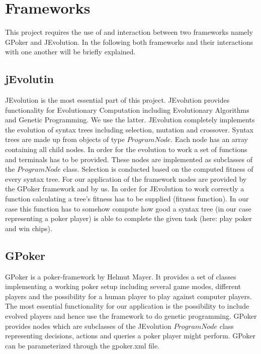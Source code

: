 	\section{Frameworks}
	This project requires the use of and interaction between two frameworks namely GPoker and JEvolution. In the following both frameworks and their interactions with one another will be briefly explained.

	\subsection{jEvolutin}
	JEvolution is the most essential part of this project. JEvolution provides functionality for Evolutionary Computation including Evolutionary Algorithms and Genetic Programming.
	We use the latter. JEvolution completely implements the evolution of syntax trees including selection, mutation and crossover. Syntax trees are made up from objects of type
	$ProgramNode$. Each node has an array containing all child nodes. In order for the evolution to work a set of functions and terminals has to be provided. These nodes
	are implemented as subclasses of the $ProgramNode$ class. Selection is conducted based on the computed fitness of every syntax tree. For our application of the framework
	nodes are provided by the GPoker framework and by us. In order for JEvolution to work correctly a function calculating a tree's fitness has to be supplied (fitness function). In
	our case this function has to somehow compute how good a syntax tree (in our case representing a poker player) is able to complete the given task (here: play poker and win
	chips).

	\subsection{GPoker}
	GPoker is a poker-framework by Helmut Mayer. It provides a set of classes implementing a working poker setup including several game modes, different players and the
	possibility for a human player to play against computer players. The most essential functionality for our application is the possibility to include evolved players and hence
	use the framework to do genetic programming. GPoker provides nodes which are subclasses of the JEvolution $ProgramNode$ class representing decisions, actions and queries a
	poker player might perform. GPoker can be parameterized through the gpoker.xml file.

